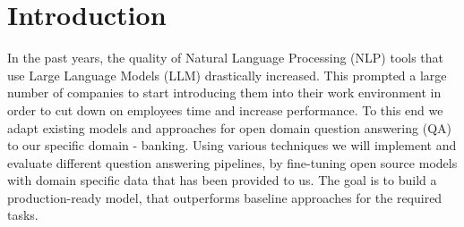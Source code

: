 \documentclass[fleqn,moreauthors,10pt]{ds_report}
\affiliation{\textit{Advisors: prof. dr. Marko Robnik Šikonja, Grega Jerkič, dr. Branislava Šandrih Todorović}}
\begin{document}
\flushbottom

\maketitle
\thispagestyle{empty}


\section*{Introduction}


    In the past years, the quality of Natural Language Processing (NLP) tools that use Large Language Models (LLM) drastically increased.
    This prompted a large number of companies to start introducing them into their work environment in order to cut down on employees time and increase performance.
    To this end we adapt existing models and approaches for open domain question answering (QA) to our specific domain - banking.
    Using various techniques we will implement and evaluate different question answering pipelines, by fine-tuning open source models with domain specific data that has been provided to us. 
    The goal is to build a production-ready model, that outperforms baseline approaches for the required tasks.
    


\end{document}
